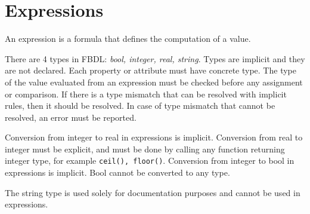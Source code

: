 \chapter{Expressions}

An expression is a formula that defines the computation of a value.

There are 4 types in FBDL: \textit{bool, integer, real, string}.
Types are implicit and they are not declared.
Each property or attribute must have concrete type.
The type of the value evaluated from an expression must be checked before any assignment or comparison.
If there is a type mismatch that can be resolved with implicit rules, then it should be resolved.
In case of type mismatch that cannot be resolved, an error must be reported.

Conversion from integer to real in expressions is implicit.
Conversion from real to integer must be explicit, and must be done by calling any function returning integer type, for example \lstinline{ceil(), floor()}.
Conversion from integer to bool in expressions is implicit.
Bool cannot be converted to any type.

The string type is used solely for documentation purposes and cannot be used in expressions.
